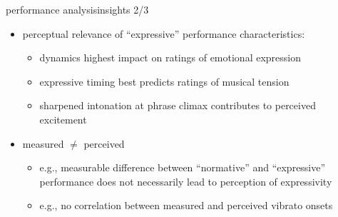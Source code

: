         \begin{frame}{performance analysis}{insights 2/3}
            \begin{itemize}
                \item perceptual relevance of “expressive” performance characteristics:
                    \begin{itemize}
                        \item	dynamics highest impact on ratings of emotional expression
                        \item   expressive timing best predicts ratings of musical tension
                        \item   sharpened intonation at phrase climax contributes to perceived excitement
                    \end{itemize}
                \item   measured $\neq$ perceived
                    \begin{itemize}
                        \item	e.g., measurable difference between “normative” and ``expressive'' performance does not necessarily lead to perception of expressivity 
                        \item   e.g., no correlation between measured and perceived vibrato onsets
                    \end{itemize}
            \end{itemize}
       \end{frame}
